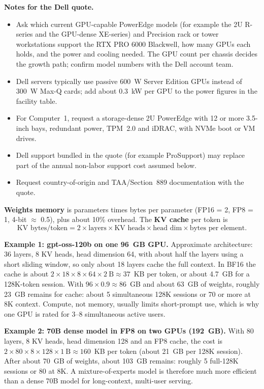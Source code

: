 \textbf{Notes for the Dell quote.}
\begin{itemize}
  \item Ask which current GPU-capable PowerEdge models (for example the 2U R-series and the
    GPU-dense XE-series) and Precision rack or tower workstations support the RTX PRO 6000
    Blackwell, how many GPUs each holds, and the power and cooling needed. The GPU count
    per chassis decides the growth path; confirm model numbers with the Dell account team.
  \item Dell servers typically use passive 600~W Server Edition GPUs instead of 300~W Max-Q
    cards; add about 0.3~kW per GPU to the power figures in the facility table.
  \item For Computer~1, request a storage-dense 2U PowerEdge with 12 or more 3.5-inch bays,
    redundant power, TPM~2.0 and iDRAC, with NVMe boot or VM drives.
  \item Dell support bundled in the quote (for example ProSupport) may replace part of the
    annual non-labor support cost assumed below.
  \item Request country-of-origin and TAA/Section~889 documentation with the quote.
\end{itemize}


\textbf{Weights memory} is parameters times bytes per parameter (FP16 = 2,
FP8 = 1, 4-bit $\approx$ 0.5), plus about 10\% overhead. The \textbf{KV cache}
per token is
\[
  \text{KV bytes/token} = 2 \times \text{layers} \times \text{KV heads} \times \text{head dim} \times \text{bytes per element}.
\]

\textbf{Example 1: gpt-oss-120b on one 96~GB GPU.} Approximate architecture: 36
layers, 8 KV heads, head dimension 64, with about half the layers using a short
sliding window, so only about 18 layers cache the full context. In BF16 the
cache is about $2 \times 18 \times 8 \times 64 \times 2~\text{B} \approx 37$~KB per
token, or about 4.7~GB for a 128K-token session. With
$96 \times 0.9 \approx 86$~GB and about 63~GB of weights, roughly 23~GB remains
for cache: about 5 simultaneous 128K sessions or 70 or more at 8K context.
Compute, not memory, usually limits short-prompt use, which is why one GPU is
rated for 3--8 simultaneous active users.

\textbf{Example 2: 70B dense model in FP8 on two GPUs (192~GB).} With 80 layers,
8 KV heads, head dimension 128 and an FP8 cache, the cost is
$2 \times 80 \times 8 \times 128 \times 1~\text{B} \approx 160$~KB per token (about
21~GB per 128K session). After about 70~GB of weights, about 103~GB remains:
roughly 5 full-128K sessions or 80 at 8K. A mixture-of-experts model is therefore
much more efficient than a dense 70B model for long-context, multi-user serving.


